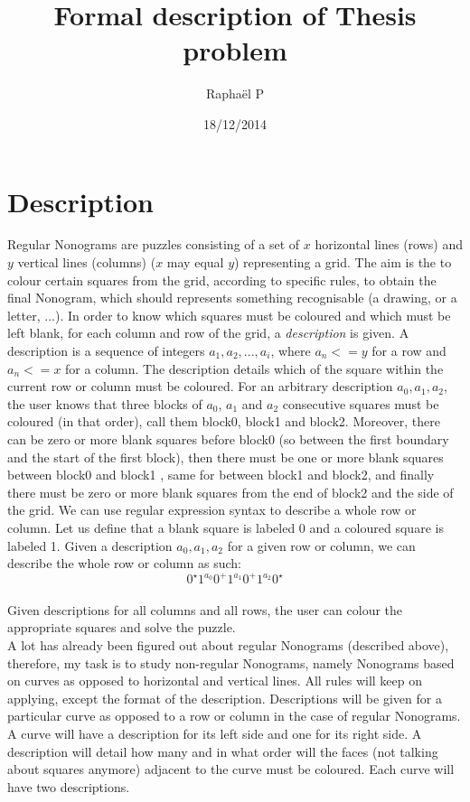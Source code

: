 \documentclass{article}
\title{Formal description of Thesis problem}
\author{Raphaël P}
\date{18/12/2014}
\begin{document}
\maketitle

\section{Description}

Regular Nonograms are puzzles consisting of a set of $x$ horizontal lines (rows) and $y$ vertical lines (columns) ($x$ may equal $y$) representing a grid. The aim is the to colour certain squares from the grid, according to specific rules, to obtain the final Nonogram, which should represents something recognisable (a drawing, or a letter, ...).
In order to know which squares must be coloured and which must be left blank, for each column and row of the grid, a \emph{description} is given. A description is a sequence of integers $a_1, a_2,..., a_i$, where $a_n <= y$ for a row and $a_n <= x$ for a column. The description details which of the square within the current row or column must be coloured. For an arbitrary description $a_0, a_1, a_2$, the user knows that three blocks of $a_0$, $a_1$ and $a_2$ consecutive squares must be coloured (in that order), call them block0, block1 and block2. Moreover, there can be zero or more blank squares before block0 (so between the first boundary and the start of the first block), then there must be one or more blank squares between block0 and block1 , same for between block1 and block2, and finally there must be zero or more blank squares from the end of block2 and the side of the grid.
We can use regular expression syntax to describe a whole row or column. Let us define that a blank square is labeled 0 and a coloured square is labeled 1. Given a description $a_0, a_1, a_2$ for a given row or column, we can describe the whole row or column as such:
\begin{equation}
\label{regular_expression}
0^\star1^{a_0}0^+1^{a_1}0^+1^{a_2}0^\star
\end{equation}
\\ 
Given descriptions for all columns and all rows, the user can colour the appropriate squares and solve the puzzle.\\

A lot has already been figured out about regular Nonograms (described above), therefore, my task is to study non-regular Nonograms, namely Nonograms based on curves as opposed to horizontal and vertical lines. All rules will keep on applying, except the format of the description. Descriptions will be given for a particular curve as opposed to a row or column in the case of regular Nonograms. A curve will have a description for its left side and one for its right side. A description will detail how many and in what order will the faces (not talking about squares anymore) adjacent to the curve must be coloured. Each curve will have two descriptions.\\
\end{document}
